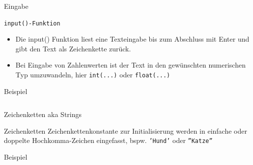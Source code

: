 \documentclass[xelatex,aspectratio=169]{beamer}
\begin{document}
\begin{frame}{Eingabe}
  \vspace{-7pt}
  \begin{block}{\texttt{input()-Funktion}}
    \begin{itemize}
      \item Die input() Funktion liest eine Texteingabe bis zum Abschluss mit Enter und gibt den Text als Zeichenkette zurück.
      \item Bei Eingabe von Zahlenwerten ist der Text in den gewünschten numerischen Typ umzuwandeln, hier \texttt{int(...)} oder \texttt{float(...)}
    \end{itemize}
  \end{block}

  \begin{exampleblock}{Beispiel}
    \inputminted{python}{src/input_example.py}
  \end{exampleblock}
\end{frame}

\begin{frame}{Zeichenketten aka Strings}
  \begin{block}{Zeichenketten}
    Zeichenkettenkonstante zur Initialisierung werden in einfache oder doppelte Hochkomma-Zeichen eingefasst, bspw. \texttt{'Hund'} oder \texttt{''Katze''}
  \end{block}
  \begin{exampleblock}{Beispiel}
    \inputminted{python}{src/string_example.py}
  \end{exampleblock}
\end{frame}
\end{document}
